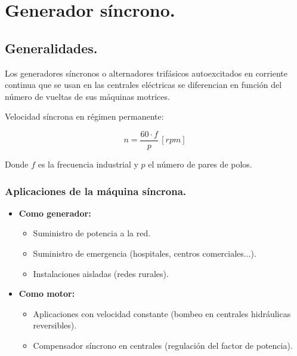 \chapter{Generador síncrono.}

	\section{Generalidades.}
		Los generadores síncronos o alternadores trifásicos autoexcitados en corriente continua que se usan en las centrales eléctricas se diferencian en función del número de vueltas de sus máquinas motrices.
		
		
		Velocidad síncrona en régimen permanente:
		
		\[n = \dfrac{60\cdot f}{p}\,[rpm]\]
		
		Donde $f$ es la frecuencia industrial y $p$ el número de pares de polos.
		
		
		\subsection{Aplicaciones de la máquina síncrona.}
			\begin{itemize}
				\item \textbf{Como generador:}
					\begin{itemize}
						\item Suministro de potencia a la red.
						\item Suministro de emergencia (hospitales, centros comerciales...).
						\item Instalaciones aisladas (redes rurales).
					\end{itemize}
					
				\item \textbf{Como motor:}
					\begin{itemize}
						\item Aplicaciones con velocidad constante (bombeo en centrales hidráulicas reversibles).
						\item Compensador síncrono en centrales (regulación del factor de potencia).
					\end{itemize}
			\end{itemize}
			
